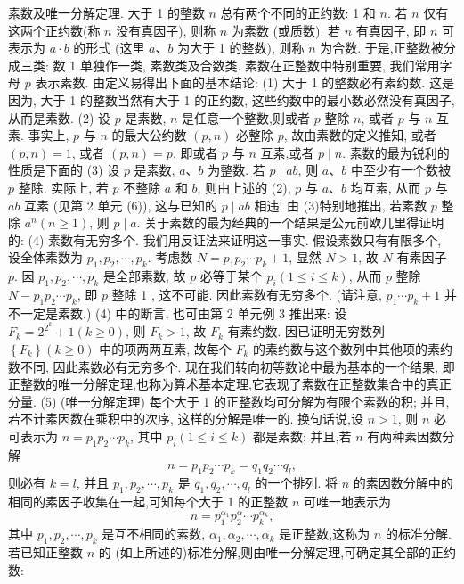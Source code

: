 
素数及唯一分解定理.
大于 1 的整数 $n$ 总有两个不同的正约数: 1 和 $n$. 若 $n$ 仅有这两个正约数(称 $n$ 没有真因子), 则称 $n$ 为素数 (或质数). 若 $n$ 有真因子, 即 $n$ 可表示为 $a \cdot b$ 的形式 (这里 $a 、 b$ 为大于 1 的整数), 则称 $n$ 为合数.
于是,正整数被分成三类: 数 1 单独作一类, 素数类及合数类.
素数在正整数中特别重要, 我们常用字母 $p$ 表示素数.
由定义易得出下面的基本结论:
(1) 大于 1 的整数必有素约数.
这是因为, 大于 1 的整数当然有大于 1 的正约数, 这些约数中的最小数必然没有真因子,从而是素数.
(2) 设 $p$ 是素数, $n$ 是任意一个整数,则或者 $p$ 整除 $n$, 或者 $p$ 与 $n$ 互素.
事实上, $p$ 与 $n$ 的最大公约数 $(p, n)$ 必整除 $p$, 故由素数的定义推知, 或者 $(p, n)=1$, 或者 $(p, n)=p$, 即或者 $p$ 与 $n$ 互素,或者 $p \mid n$.
素数的最为锐利的性质是下面的
(3) 设 $p$ 是素数, $a 、 b$ 为整数.
若 $p \mid a b$, 则 $a 、 b$ 中至少有一个数被 $p$ 整除.
实际上, 若 $p$ 不整除 $a$ 和 $b$, 则由上述的 (2), $p$ 与 $a 、 b$ 均互素, 从而 $p$ 与 $a b$ 互素 (见第 2 单元 (6)), 这与已知的 $p \mid a b$ 相违!
由 (3)特别地推出, 若素数 $p$ 整除 $a^n(n \geqslant 1)$, 则 $p \mid a$.
关于素数的最为经典的一个结果是公元前欧几里得证明的:
(4) 素数有无穷多个.
我们用反证法来证明这一事实.
假设素数只有有限多个, 设全体素数为 $p_1, p_2, \cdots, p_k$. 考虑数 $N=p_1 p_2 \cdots p_k+1$, 显然 $N>1$, 故 $N$ 有素因子 $p$. 因 $p_1, p_2, \cdots, p_k$ 是全部素数, 故 $p$ 必等于某个 $p_i(1 \leqslant i \leqslant k)$, 从而 $p$ 整除 $N- p_1 p_2 \cdots p_k$, 即 $p$ 整除 1 , 这不可能.
因此素数有无穷多个.
(请注意, $p_1 \cdots p_k+1$ 并不一定是素数.)
(4) 中的断言, 也可由第 2 单元例 3 推出来: 设 $F_k=2^{2^k}+1(k \geqslant 0)$, 则
$F_k>1$, 故 $F_k$ 有素约数.
因已证明无穷数列 $\left\{F_k\right\}(k \geqslant 0)$ 中的项两两互素, 故每个 $F_k$ 的素约数与这个数列中其他项的素约数不同, 因此素数必有无穷多个.
现在我们转向初等数论中最为基本的一个结果, 即正整数的唯一分解定理,也称为算术基本定理,它表现了素数在正整数集合中的真正分量.
(5) (唯一分解定理) 每个大于 1 的正整数均可分解为有限个素数的积; 并且, 若不计素因数在乘积中的次序, 这样的分解是唯一的.
换句话说,设 $n>1$, 则 $n$ 必可表示为 $n=p_1 p_2 \cdots p_k$, 其中 $p_i(1 \leqslant i \leqslant k)$ 都是素数; 并且,若 $n$ 有两种素因数分解
$$
n=p_1 p_2 \cdots p_k=q_1 q_2 \cdots q_l,
$$
则必有 $k=l$, 并且 $p_1, p_2, \cdots, p_k$ 是 $q_1, q_2, \cdots, q_l$ 的一个排列.
将 $n$ 的素因数分解中的相同的素因子收集在一起,可知每个大于 1 的正整数 $n$ 可唯一地表示为
$$
n=p_1^{\alpha_1} p_2^\alpha \cdots p_k^{\alpha_k},
$$
其中 $p_1, p_2, \cdots, p_k$ 是互不相同的素数, $\alpha_1, \alpha_2, \cdots, \alpha_k$ 是正整数,这称为 $n$ 的标准分解.
若已知正整数 $n$ 的 (如上所述的)标准分解,则由唯一分解定理,可确定其全部的正约数:
